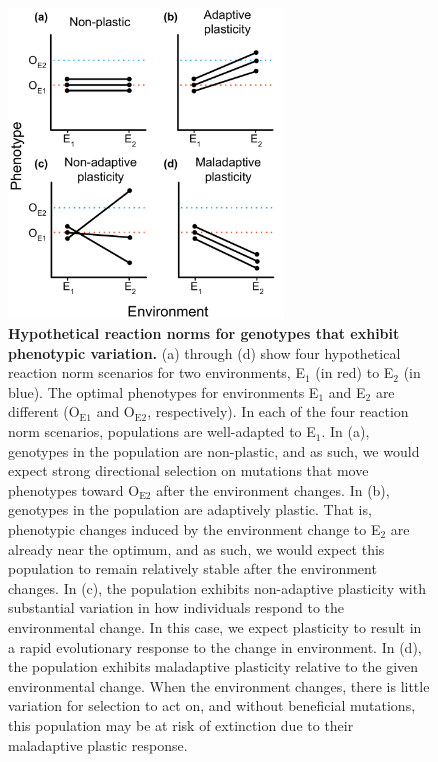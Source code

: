 \begin{figure}[ht!]
    \centering
    \includegraphics[width=0.65\textwidth]{media/reaction-norms.pdf}
    \caption{\small
    \textbf{Hypothetical reaction norms for genotypes that exhibit phenotypic variation.}
    (a) through (d) show four hypothetical reaction norm scenarios for two environments, E$_1$ (in red) to E$_2$ (in blue).  
    The optimal phenotypes for environments E$_1$ and E$_2$ are different (O$_{\text{E}1}$ and O$_{\text{E}2}$, respectively).
    In each of the four reaction norm scenarios, populations are well-adapted to E$_1$.
    In (a), genotypes in the population are non-plastic, and as such, we would expect strong directional selection on mutations that move phenotypes toward O$_{\text{E}2}$ after the environment changes.
    In (b), genotypes in the population are adaptively plastic. 
    That is, phenotypic changes induced by the environment change to E$_2$ are already near the optimum, and as such, we would expect this population to remain relatively stable after the environment changes.
    In (c), the population exhibits non-adaptive plasticity with substantial variation in how individuals respond to the environmental change. 
    In this case, we expect plasticity to result in a rapid evolutionary response to the change in environment.  
    In (d), the population exhibits maladaptive plasticity relative to the given environmental change. 
    When the environment changes, there is little variation for selection to act on, and without beneficial mutations, this population may be at risk of extinction due to their maladaptive plastic response.
    }
    \label{fig:reaction-norms}
\end{figure}

